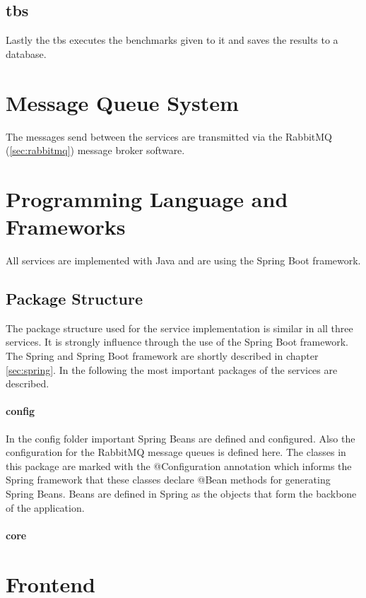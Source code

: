 \subsection{\acl{tbs}}
\label{sec:ts_benchmarking_service}
Lastly the \ac{tbs} executes the benchmarks given to it and saves the results to a database.



\section{Message Queue System}
\label{sec:message_queue}
The messages send between the services are transmitted via the RabbitMQ (\ref{sec:rabbitmq}) message broker software.


\section{Programming Language and Frameworks}
\label{sec:prog_lang_and_framework}
All services are implemented with Java and are using the Spring Boot framework.

\subsection{Package Structure}
\label{sec:folder_structure}
The package structure used for the service implementation is similar in all three services.
It is strongly influence through the use of the Spring Boot framework.
The Spring and Spring Boot framework are shortly described in chapter \ref{sec:spring}.
In the following the most important packages of the services are described.

\paragraph{config}
In the config folder important Spring Beans are defined and configured.
Also the configuration for the RabbitMQ message queues is defined here.
The classes in this package are marked with the @Configuration annotation which informs the Spring framework that these classes declare @Bean methods for generating Spring Beans.
Beans are defined in Spring as the objects that form the backbone of the application.

\paragraph{core}



\section{Frontend}
\label{sec:frontend}